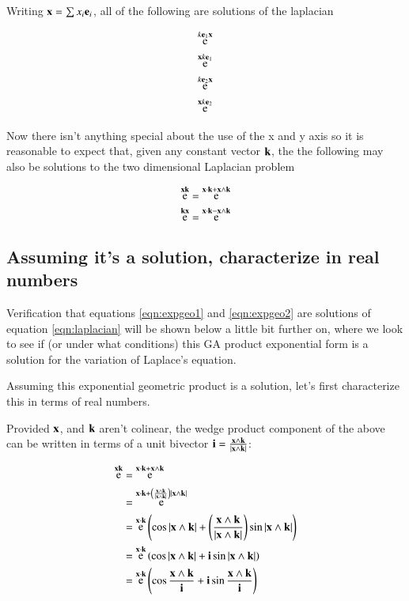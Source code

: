 \documentclass{article}      %
\DeclareMathOperator{\Exp}{e}
\begin{document}
Writing $\mathbf{x} = \sum x_i \mathbf{e}_i$, all of the following are solutions
of the laplacian

\begin{align*}
\Exp^{k\Be_1\Bx} \\
\Exp^{\Bx k\Be_1} \\
\Exp^{k\Be_2\Bx} \\
\Exp^{\Bx k\Be_2} \\
\end{align*}

Now there isn't anything special about the use of the x and y axis so it is reasonable to expect that, given any constant vector $\mathbf{k}$,
the the following may also be solutions to the two dimensional Laplacian problem

\begin{equation}\label{eqn:expgeo1}
\Exp^{\Bx\Bk} = \Exp^{\Bx \cdot \Bk + \Bx \wedge \Bk}
\end{equation}
\begin{equation}\label{eqn:expgeo2}
\Exp^{\Bk\Bx} = \Exp^{\Bx \cdot \Bk - \Bx \wedge \Bk}
\end{equation}

\subsection{ Assuming it's a solution, characterize in real numbers }

Verification that equations \ref{eqn:expgeo1} and \ref{eqn:expgeo2} are solutions of equation \ref{eqn:laplacian}
will be shown below a little bit further on, where we
look to see if (or under what conditions) this GA product exponential form is a solution for the  variation of Laplace's equation.

Assuming this exponential geometric product is a solution, let's first characterize this in terms of real numbers.

Provided $\mathbf{x}$, and $\mathbf{k}$ aren't colinear, the wedge product component of the above can be written in terms of a unit bivector
$\mathbf{i} = \frac{\mathbf{x} \wedge \mathbf{k}}{\lvert{\mathbf{x}\wedge \mathbf{k}}\rvert}$:

\begin{align*}
\Exp^{\Bx\Bk} &= \Exp^{\Bx \cdot \Bk + \Bx \wedge \Bk} \\
&= \Exp^{\Bx \cdot \Bk + \left( \frac{\Bx \wedge \Bk}{\abs{\Bx \wedge \Bk}} \right) {\abs{\Bx \wedge \Bk}}} \\
&= \Exp^{\Bx \cdot \Bk} \left( \cos{\abs{\Bx \wedge \Bk}} + \left(\frac{\Bx \wedge \Bk}{\abs{\Bx \wedge \Bk}}\right) \sin{\abs{\Bx \wedge \Bk}} \right) \\
&= \Exp^{\Bx \cdot \Bk} \left( \cos{\abs{\Bx \wedge \Bk}} + \Bi \sin{\abs{\Bx \wedge \Bk}} \right) \\
&= \Exp^{\Bx \cdot \Bk} \left( \cos{\frac{\Bx \wedge \Bk}{\Bi}} + \Bi \sin{\frac{\Bx \wedge \Bk}{\Bi}} \right) \\
\end{align*}
\end{document}
